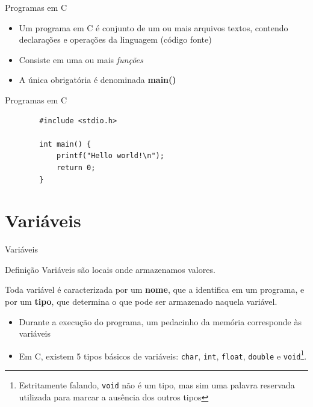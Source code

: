 \documentclass[handout]{beamer}
\begin{document}
\begin{frame}{Programas em C}

    \begin{itemize}[<+->]
        \item Um programa em C é conjunto de um ou mais arquivos textos, contendo declarações e operações da linguagem (código fonte)
        \item Consiste em uma ou mais \textit{funções}
        \item A única obrigatória é denominada \textbf{main()}
    \end{itemize}
\end{frame}


\begin{frame}[fragile]{Programas em C}

    \begin{verbatim}
        #include <stdio.h>

        int main() {
            printf("Hello world!\n");
            return 0;
        }
    \end{verbatim}
\end{frame}


\section{Variáveis}

\begin{frame}{Variáveis}

    \begin{block}{Definição}
        Variáveis são locais onde armazenamos valores.

        Toda variável é caracterizada por um \textbf{nome}, que a identifica em um programa, e por um \textbf{tipo}, que determina o que pode ser armazenado naquela variável.
    \end{block}

    \pause
    \begin{itemize}[<+->]
        \item Durante a execução do programa, um pedacinho da memória corresponde às variáveis
        \item Em C, existem 5 tipos básicos de variáveis: \texttt{char}, \texttt{int}, \texttt{float}, \texttt{double} e \texttt{void}\footnote{Estritamente falando, \texttt{void} não é um tipo, mas sim uma palavra reservada utilizada para marcar a ausência dos outros tipos}.
    \end{itemize}
\end{frame}
\end{document}
